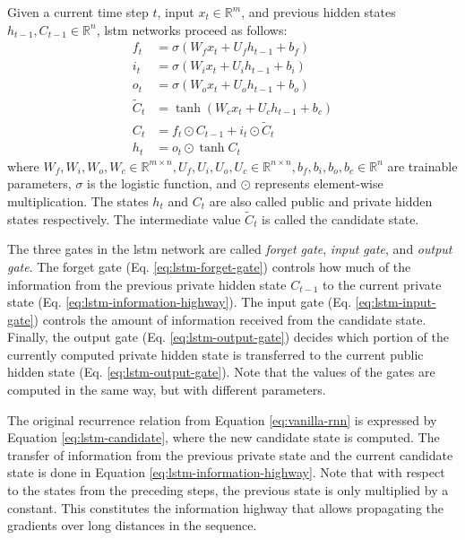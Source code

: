 Given a current time step $t$, input $x_t \in \mathbb{R}^m$, and previous
hidden states $h_{t-1}, C_{t-1} \in \mathbb{R}^n$, \ac{lstm} networks proceed
as follows:
%
\begin{align}
  f_t &= \sigma\left(W_f x_t + U_f h_{t-1} + b_f\right) \label{eq:lstm-forget-gate} \\
  i_t &= \sigma\left(W_i x_t + U_i h_{t-1} + b_i\right) \label{eq:lstm-input-gate} \\
  o_t &= \sigma\left(W_o x_t + U_o h_{t-1} + b_o\right) \label{eq:lstm-output-gate} \\
  \tilde{C}_t &= \tanh \left( W_c x_t + U_c h_{t-1} + b_c \right) \label{eq:lstm-candidate} \\
  C_t &= f_t \odot C_{t-1} + i_t \odot \tilde{C}_t \label{eq:lstm-information-highway} \\
  h_t &= o_t \odot \tanh C_t \label{eq:lstm-hidden-state}
\end{align}
%
where $W_f, W_i, W_o, W_c \in \mathbb{R}^{m \times n}, U_f, U_i, U_o, U_c \in
\mathbb{R}^{n \times n}, b_f, b_i, b_o, b_c \in \mathbb{R}^n$ are trainable
parameters, $\sigma$ is the logistic function, and $\odot$ represents
element-wise multiplication. The states $h_t$ and $C_t$ are also called public
and private hidden states respectively. The intermediate value $\tilde{C}_t$ is
called the candidate state.

The three gates in the \ac{lstm} network are called \emph{forget gate},
\emph{input gate}, and \emph{output gate}. The forget gate (Eq.
\ref{eq:lstm-forget-gate}) controls how much of the information from the
previous private hidden state $C_{t-1}$ to the current private state (Eq.
\ref{eq:lstm-information-highway}). The input gate (Eq.
\ref{eq:lstm-input-gate}) controls the amount of information received from the
candidate state. Finally, the output gate (Eq. \ref{eq:lstm-output-gate})
decides which portion of the currently computed private hidden state is
transferred to the current public hidden state
(Eq. \ref{eq:lstm-output-gate}). Note that the values of the gates are computed
in the same way, but with different parameters.

The original recurrence relation from Equation \ref{eq:vanilla-rnn} is expressed
by Equation \ref{eq:lstm-candidate}, where the new candidate state is
computed. The transfer of information from the previous private state and the
current candidate state is done in Equation
\ref{eq:lstm-information-highway}. Note that with respect to the states from the
preceding steps, the previous state is only multiplied by a constant. This
constitutes the information highway that allows propagating the gradients over
long distances in the sequence.

